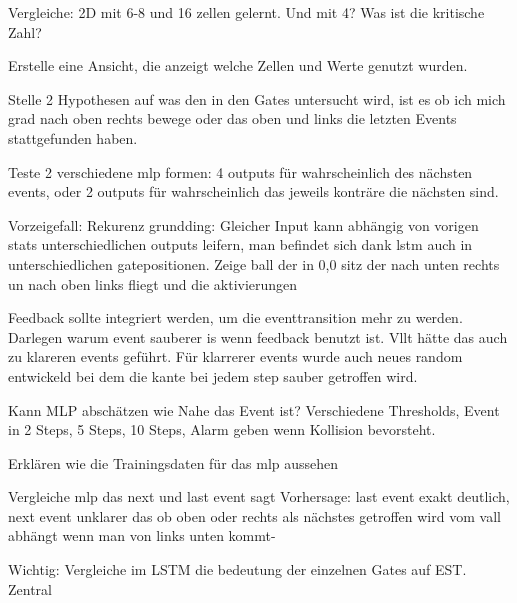 Vergleiche: 2D mit 6-8 und 16 zellen gelernt.
Und mit 4? Was ist die kritische Zahl?

Erstelle eine Ansicht, die anzeigt welche Zellen und Werte genutzt wurden.

Stelle 2 Hypothesen auf was den in den Gates untersucht wird, ist es ob ich mich grad nach oben rechts bewege oder das oben und links die letzten Events stattgefunden haben.

Teste 2 verschiedene mlp formen: 4 outputs für wahrscheinlich des nächsten events,
oder 2 outputs für wahrscheinlich das jeweils konträre die nächsten sind.


Vorzeigefall: Rekurenz grundding: Gleicher Input kann abhängig von vorigen stats unterschiedlichen outputs leifern, man befindet sich dank lstm auch in unterschiedlichen gatepositionen.
Zeige ball der in 0,0 sitz der nach unten rechts un nach oben links fliegt und die aktivierungen

Feedback sollte integriert werden, um die eventtransition mehr zu werden. Darlegen warum event sauberer is wenn feedback benutzt ist. Vllt hätte das auch zu klareren events geführt. Für klarrerer events wurde auch neues random entwickeld bei dem die kante bei jedem step sauber getroffen wird.

Kann MLP abschätzen wie Nahe das Event ist?
Verschiedene Thresholds, Event in 2 Steps, 5 Steps, 10 Steps, Alarm geben wenn Kollision bevorsteht.

Erklären wie die Trainingsdaten für das mlp aussehen

Vergleiche mlp das next und last event sagt
Vorhersage: last event exakt deutlich, next event unklarer das ob oben oder rechts als nächstes getroffen wird vom vall abhängt wenn man von links unten kommt-

Wichtig:
Vergleiche im LSTM die bedeutung der einzelnen Gates auf EST. Zentral
